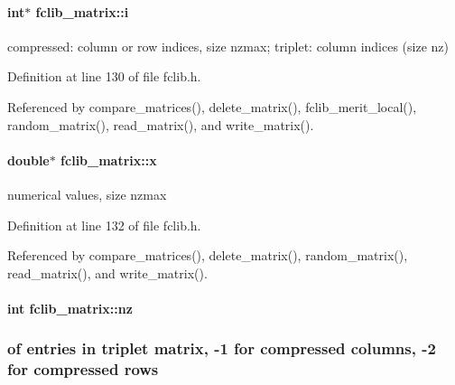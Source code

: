 \hypertarget{structfclib__matrix_aed86c681657206e7502450e437dba667}{
\paragraph[{i}]{\setlength{\rightskip}{0pt plus 5cm}int$\ast$ fclib\-\_\-matrix\-::i}}\label{structfclib__matrix_aed86c681657206e7502450e437dba667}


compressed\-: column or row indices, size nzmax; triplet\-: column indices (size nz) 



Definition at line 130 of file fclib.\-h.



Referenced by compare\-\_\-matrices(), delete\-\_\-matrix(), fclib\-\_\-merit\-\_\-local(), random\-\_\-matrix(), read\-\_\-matrix(), and write\-\_\-matrix().

\hypertarget{structfclib__matrix_aba1891f51a81f973249456c91715e06d}{
\paragraph[{x}]{\setlength{\rightskip}{0pt plus 5cm}double$\ast$ fclib\-\_\-matrix\-::x}}\label{structfclib__matrix_aba1891f51a81f973249456c91715e06d}


numerical values, size nzmax 



Definition at line 132 of file fclib.\-h.



Referenced by compare\-\_\-matrices(), delete\-\_\-matrix(), random\-\_\-matrix(), read\-\_\-matrix(), and write\-\_\-matrix().

\hypertarget{structfclib__matrix_a7d64a7cddc93a8e1f96ab32e9afe0bbb}{
\paragraph[{nz}]{\setlength{\rightskip}{0pt plus 5cm}int fclib\-\_\-matrix\-::nz}}\label{structfclib__matrix_a7d64a7cddc93a8e1f96ab32e9afe0bbb}


\subsubsection*{of entries in triplet matrix, -\/1 for compressed columns, -\/2 for compressed rows}



